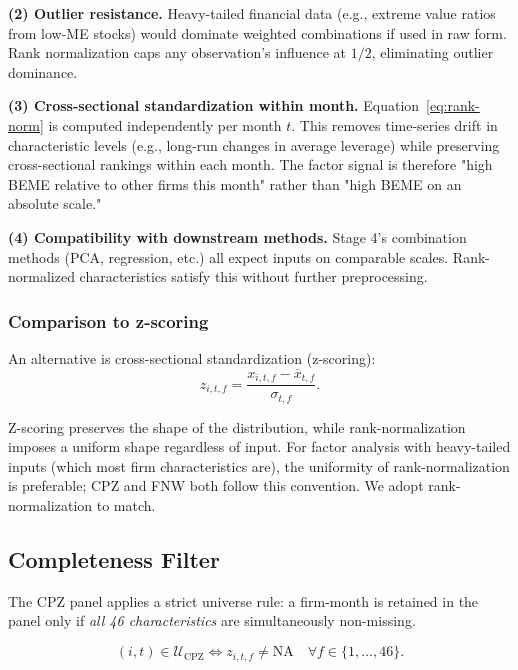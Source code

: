 \textbf{(2) Outlier resistance.} Heavy-tailed financial data
(e.g., extreme value ratios from low-ME stocks) would dominate
weighted combinations if used in raw form. Rank normalization caps any
observation's influence at \(1/2\), eliminating outlier dominance.

\textbf{(3) Cross-sectional standardization within month.}
Equation~\eqref{eq:rank-norm} is computed independently per month \(t\).
This removes time-series drift in characteristic levels (e.g., long-run
changes in average leverage) while preserving cross-sectional rankings
within each month. The factor signal is therefore "high BEME relative
to other firms this month" rather than "high BEME on an absolute scale."

\textbf{(4) Compatibility with downstream methods.} Stage 4's
combination methods (PCA, regression, etc.) all expect inputs on
comparable scales. Rank-normalized characteristics satisfy this
without further preprocessing.

\subsubsection{Comparison to z-scoring}

An alternative is cross-sectional standardization (z-scoring):
\begin{equation}
z_{i,t,f} = \frac{x_{i,t,f} - \overline{x}_{t,f}}{\sigma_{t,f}}.
\end{equation}

Z-scoring preserves the shape of the distribution, while rank-normalization
imposes a uniform shape regardless of input. For factor analysis with
heavy-tailed inputs (which most firm characteristics are), the uniformity
of rank-normalization is preferable; CPZ and FNW both follow this
convention. We adopt rank-normalization to match.

\subsection{Completeness Filter}
\label{subsec:stage0-completeness}

The CPZ panel applies a strict universe rule: a firm-month is retained
in the panel only if \emph{all 46 characteristics} are simultaneously
non-missing.

\begin{equation}
(i, t) \in \mathcal{U}_{\text{CPZ}}
\iff
z_{i,t,f} \neq \text{NA} \quad \forall f \in \{1, \ldots, 46\}.
\label{eq:completeness-filter}
\end{equation}

